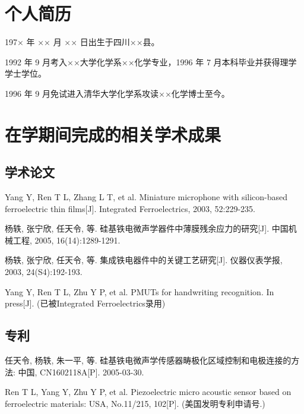 
\begin{resume}

  \section*{个人简历}

  197× 年 ×× 月 ×× 日出生于四川××县。

  1992 年 9 月考入××大学化学系××化学专业，1996 年 7 月本科毕业并获得理学学士学位。

  1996 年 9 月免试进入清华大学化学系攻读××化学博士至今。


  \section*{在学期间完成的相关学术成果}

  \subsection*{学术论文}

  \begin{achievements}
    \item Yang Y, Ren T L, Zhang L T, et al. Miniature microphone with silicon-based ferroelectric thin films[J]. Integrated Ferroelectrics, 2003, 52:229-235.
    \item 杨轶, 张宁欣, 任天令, 等. 硅基铁电微声学器件中薄膜残余应力的研究[J]. 中国机械工程, 2005, 16(14):1289-1291.
    \item 杨轶, 张宁欣, 任天令, 等. 集成铁电器件中的关键工艺研究[J]. 仪器仪表学报, 2003, 24(S4):192-193.
    \item Yang Y, Ren T L, Zhu Y P, et al. PMUTs for handwriting recognition. In press[J]. (已被Integrated Ferroelectrics录用)
  \end{achievements}


  \subsection*{专利}

  \begin{achievements}
    \item 任天令, 杨轶, 朱一平, 等. 硅基铁电微声学传感器畴极化区域控制和电极连接的方法: 中国, CN1602118A[P]. 2005-03-30.
    \item Ren T L, Yang Y, Zhu Y P, et al. Piezoelectric micro acoustic sensor based on ferroelectric materials: USA, No.11/215, 102[P]. (美国发明专利申请号.)
  \end{achievements}

\end{resume}



